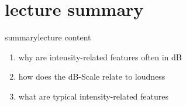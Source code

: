     \section[summary]{lecture summary}
        \begin{frame}{summary}{lecture content}
            \begin{enumerate}
                \item   why are intensity-related features often in dB
                \smallskip
                \item<2->   how does the dB-Scale relate to loudness
                \smallskip
                \item<3->   what are typical intensity-related features
            \end{enumerate}
        \end{frame}


